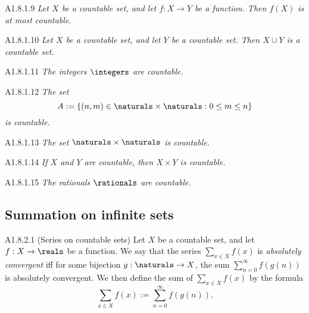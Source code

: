 \begin{corollary}{A1.8.1.9}
    \emph{Let $X$ be a countable set, and let $f: X \rightarrow Y$ be a function.
    Then $f(X)$ is at most countable.}
\end{corollary}

\begin{proposition}{A1.8.1.10}
    \emph{Let $X$ be a countable set, and let $Y$ be a countable set. Then $X \cup Y$
    is a countable set.}
\end{proposition}

\begin{corollary}{A1.8.1.11}
    \emph{The integers $\integers$ are countable.}
\end{corollary}

\begin{lemma}{A1.8.1.12}
    \emph{The set
    \begin{equation*}
        A := \{(n, m) \in \naturals \times \naturals : 0 \leq m \leq n\}
    \end{equation*}
    is countable.}
\end{lemma}

\begin{corollary}{A1.8.1.13}
    \emph{The set $\naturals \times \naturals$ is countable.}
\end{corollary}

\begin{corollary}{A1.8.1.14}
    \emph{If $X$ and $Y$ are countable, then $X \times Y$ is countable.}
\end{corollary}

\begin{corollary}{A1.8.1.15}
    \emph{The rationals $\rationals$ are countable.}
\end{corollary}

\subsection{Summation on infinite sets}
\begin{definition}{A1.8.2.1}
    (Series on countable sets) Let $X$ be a countable set, and let $f: X \to \reals$
    be a function. We say that the series $\sum_{x \in X} f(x)$ is \emph{absolutely
    convergent} iff for some bijection $g: \naturals \to X$, the sum $\sum_{n=0}^{\infty} f(g(n))$
    is absolutely convergent. We then define the sum of $\sum_{x \in X} f(x)$ by
    the formula
    \begin{equation*}
        \sum_{x \in X} f(x) := \sum_{n=0}^{\infty} f(g(n)).
    \end{equation*}
\end{definition}


